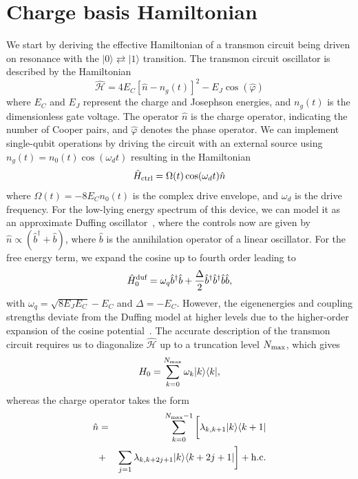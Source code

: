 \documentclass[superscriptaddress,amsmath,amssymb,aps,twocolumn,praplied,notitlepage]{revtex4-2}
\newcommand{\ket}[1]{\vert #1 \rangle}
\newcommand{\bra}[1]{\langle #1 \vert}
\newcommand{\ketbra}[2]{\vert #1 \rangle \langle #2 \vert}
\begin{document}
\section{Charge basis Hamiltonian}\label{derivationH}
We start by deriving the effective Hamiltonian of a transmon circuit being driven on resonance with the $\ket{0} \rightleftarrows \ket{1}$ transition. The transmon circuit oscillator is described by the Hamiltonian~\cite{PhysRevA.76.042319}
\begin{equation}
    \hat{\mathcal{H}} = 4E_{C}[\hat{n}-n_g(t)]^2-E_{J}\cos(\hat{\varphi})
\label{eq:transmon hamiltonian exact}
\end{equation}
where $E_{C}$ and $E_{J}$ represent the charge and Josephson energies, and $n_g(t)$ is the dimensionless gate voltage. The operator $\hat{n}$ is the charge operator, indicating the number of Cooper pairs, and $\hat{\varphi}$ denotes the phase operator. We can implement single-qubit operations by driving the circuit with an external source using $n_g(t)=n_{0}(t)\cos(\omega_{d}t)$ resulting in the Hamiltonian
\begin{eqnarray}
    \hat{H}_{{\rm{ctrl}}}=\Omega(t)\cos(\omega_{d}t)\hat{n}
\end{eqnarray}
where $\Omega(t)=-8E_Cn_{0}(t)$ is the complex drive envelope, and $\omega_{d}$ is the drive frequency. For the low-lying energy spectrum of this device, we can model it as an approximate Duffing oscillator~\cite{Khani2009Optimal,Blais2021Circuit}, where the controls now are given by $\hat{n}\propto(\hat{b}^{\dag}+\hat{b})$, where $\hat{b}$ is the annihilation operator of a linear oscillator. For the free energy term, we expand the cosine up to fourth order leading to  
\begin{equation}
    \hat{H}_0^{\textnormal{duf}} = \omega_q \hat{b}^{\dagger}\hat{b}+\frac{\Delta}{2}\hat{b}^{\dagger}\hat{b}^{\dagger}\hat{b}\hat{b}
    ,
\end{equation}
with $\omega_q = \sqrt{8 E_J E_C} - E_C$ and $\Delta=-E_C$. However, the eigenenergies and coupling strengths deviate from the Duffing model at higher levels due to the higher-order expansion of the cosine potential~\cite{Khani2009Optimal}. The accurate description of the transmon circuit requires us to diagonalize $\hat{\mathcal{H}}$ up to a truncation level $N_{\rm{max}}$, which gives
\begin{equation}
    H_0 = \sum_{k=0}^{N_{\rm{max}}} \omega_k \ket{k}\bra{k},
\end{equation}
whereas the charge operator takes the form
\begin{eqnarray}\nonumber
    \hat{n}&=&\sum_{k=0}^{N_{{\rm{max}}}-1}\bigg[\lambda_{k,k+1}\ketbra{k}{k+1}\\
            &+&\sum_{j=1} \lambda_{k,k+2j+1}\ketbra{k}{k+2j+1}\bigg]+\rm{h.c}.
\end{eqnarray}
\end{document}
